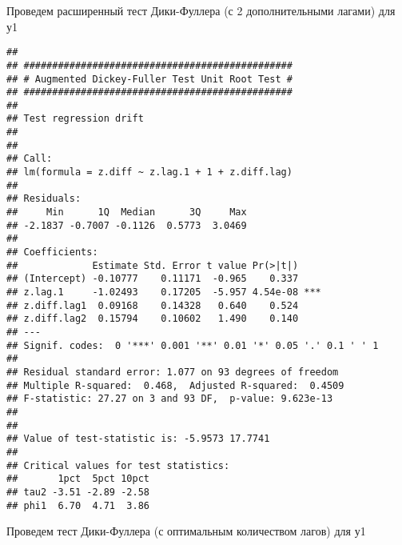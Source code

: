\documentclass[
]{article}
\newenvironment{Shaded}{\begin{snugshade}}{\end{snugshade}}
\newcommand{\AttributeTok}[1]{\textcolor[rgb]{0.13,0.29,0.53}{#1}}
\newcommand{\DecValTok}[1]{\textcolor[rgb]{0.00,0.00,0.81}{#1}}
\newcommand{\FunctionTok}[1]{\textcolor[rgb]{0.13,0.29,0.53}{\textbf{#1}}}
\newcommand{\NormalTok}[1]{#1}
\newcommand{\SpecialCharTok}[1]{\textcolor[rgb]{0.81,0.36,0.00}{\textbf{#1}}}
\newcommand{\StringTok}[1]{\textcolor[rgb]{0.31,0.60,0.02}{#1}}
\begin{document}
Проведем расширенный тест Дики-Фуллера (с 2 дополнительными лагами) для
у1

\begin{Shaded}
\end{Shaded}

\begin{verbatim}
## 
## ############################################### 
## # Augmented Dickey-Fuller Test Unit Root Test # 
## ############################################### 
## 
## Test regression drift 
## 
## 
## Call:
## lm(formula = z.diff ~ z.lag.1 + 1 + z.diff.lag)
## 
## Residuals:
##     Min      1Q  Median      3Q     Max 
## -2.1837 -0.7007 -0.1126  0.5773  3.0469 
## 
## Coefficients:
##             Estimate Std. Error t value Pr(>|t|)    
## (Intercept) -0.10777    0.11171  -0.965    0.337    
## z.lag.1     -1.02493    0.17205  -5.957 4.54e-08 ***
## z.diff.lag1  0.09168    0.14328   0.640    0.524    
## z.diff.lag2  0.15794    0.10602   1.490    0.140    
## ---
## Signif. codes:  0 '***' 0.001 '**' 0.01 '*' 0.05 '.' 0.1 ' ' 1
## 
## Residual standard error: 1.077 on 93 degrees of freedom
## Multiple R-squared:  0.468,  Adjusted R-squared:  0.4509 
## F-statistic: 27.27 on 3 and 93 DF,  p-value: 9.623e-13
## 
## 
## Value of test-statistic is: -5.9573 17.7741 
## 
## Critical values for test statistics: 
##       1pct  5pct 10pct
## tau2 -3.51 -2.89 -2.58
## phi1  6.70  4.71  3.86
\end{verbatim}

Проведем тест Дики-Фуллера (с оптимальным количеством лагов) для у1

\begin{Shaded}
\end{Shaded}
\end{document}
